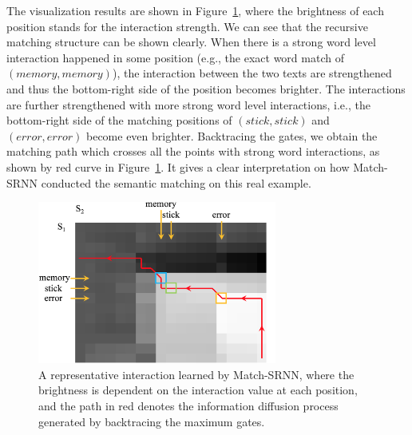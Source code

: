 The visualization results are shown in Figure~\ref{fig:tensor}, where the brightness of each position stands for the interaction strength. We can see that the recursive matching structure can be shown clearly. When there is a strong word level interaction happened in some position (e.g., the exact word match of $(memory, memory)$), the interaction between the two texts are strengthened and thus the bottom-right side of the position becomes brighter. The interactions are further strengthened with more strong word level interactions, i.e., the bottom-right side of the matching positions of $(stick,stick)$ and $(error, error)$ become even brighter. Backtracing the gates, we obtain the matching path which crosses all the points with strong word interactions, as shown by red curve in Figure~\ref{fig:tensor}. It gives a clear interpretation on how Match-SRNN conducted the semantic matching on this real example.
\begin{figure}[t]
\includegraphics[width=0.7\textwidth]{figures/qa_path.png}
\caption{A representative interaction learned by Match-SRNN, where the brightness is dependent on the interaction value at each position, and the path in red denotes the information diffusion process generated by backtracing the maximum gates.}
\label{fig:tensor}
\end{figure}

